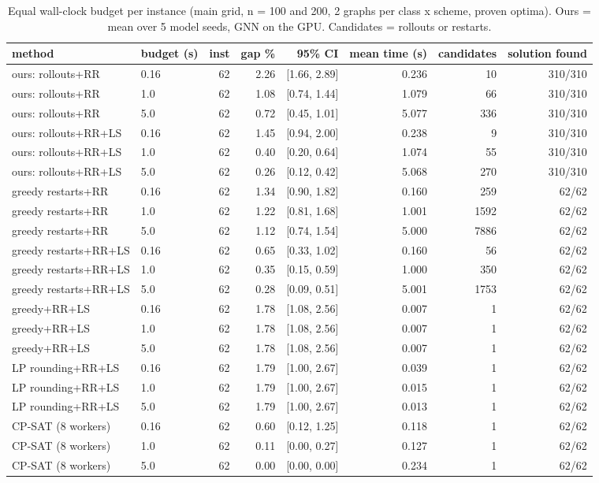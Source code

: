 \begin{table}[t]
\centering
\caption{Equal wall-clock budget per instance (main grid, n = 100 and 200, 2 graphs per class x scheme, proven optima). Ours = mean over 5 model seeds, GNN on the GPU. Candidates = rollouts or restarts.}
\label{tab:equal_time}
\scriptsize
\begin{tabular}{llrrrrrr}
\toprule
method & budget (s) & inst & gap \% & 95\% CI & mean time (s) & candidates & solution found \\
\midrule
ours: rollouts+RR & 0.16 & 62 & 2.26 & [1.66, 2.89] & 0.236 & 10 & 310/310 \\
ours: rollouts+RR & 1.0 & 62 & 1.08 & [0.74, 1.44] & 1.079 & 66 & 310/310 \\
ours: rollouts+RR & 5.0 & 62 & 0.72 & [0.45, 1.01] & 5.077 & 336 & 310/310 \\
ours: rollouts+RR+LS & 0.16 & 62 & 1.45 & [0.94, 2.00] & 0.238 & 9 & 310/310 \\
ours: rollouts+RR+LS & 1.0 & 62 & 0.40 & [0.20, 0.64] & 1.074 & 55 & 310/310 \\
ours: rollouts+RR+LS & 5.0 & 62 & 0.26 & [0.12, 0.42] & 5.068 & 270 & 310/310 \\
greedy restarts+RR & 0.16 & 62 & 1.34 & [0.90, 1.82] & 0.160 & 259 & 62/62 \\
greedy restarts+RR & 1.0 & 62 & 1.22 & [0.81, 1.68] & 1.001 & 1592 & 62/62 \\
greedy restarts+RR & 5.0 & 62 & 1.12 & [0.74, 1.54] & 5.000 & 7886 & 62/62 \\
greedy restarts+RR+LS & 0.16 & 62 & 0.65 & [0.33, 1.02] & 0.160 & 56 & 62/62 \\
greedy restarts+RR+LS & 1.0 & 62 & 0.35 & [0.15, 0.59] & 1.000 & 350 & 62/62 \\
greedy restarts+RR+LS & 5.0 & 62 & 0.28 & [0.09, 0.51] & 5.001 & 1753 & 62/62 \\
greedy+RR+LS & 0.16 & 62 & 1.78 & [1.08, 2.56] & 0.007 & 1 & 62/62 \\
greedy+RR+LS & 1.0 & 62 & 1.78 & [1.08, 2.56] & 0.007 & 1 & 62/62 \\
greedy+RR+LS & 5.0 & 62 & 1.78 & [1.08, 2.56] & 0.007 & 1 & 62/62 \\
LP rounding+RR+LS & 0.16 & 62 & 1.79 & [1.00, 2.67] & 0.039 & 1 & 62/62 \\
LP rounding+RR+LS & 1.0 & 62 & 1.79 & [1.00, 2.67] & 0.015 & 1 & 62/62 \\
LP rounding+RR+LS & 5.0 & 62 & 1.79 & [1.00, 2.67] & 0.013 & 1 & 62/62 \\
CP-SAT (8 workers) & 0.16 & 62 & 0.60 & [0.12, 1.25] & 0.118 & 1 & 62/62 \\
CP-SAT (8 workers) & 1.0 & 62 & 0.11 & [0.00, 0.27] & 0.127 & 1 & 62/62 \\
CP-SAT (8 workers) & 5.0 & 62 & 0.00 & [0.00, 0.00] & 0.234 & 1 & 62/62 \\
\bottomrule
\end{tabular}
\end{table}
